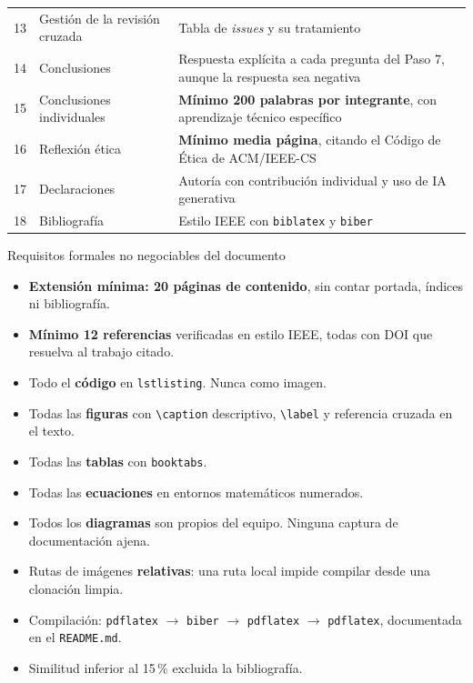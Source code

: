 \documentclass[11pt,a4paper]{article}
\begin{document}
\begin{center}
\begin{longtable}{@{}p{0.7cm}p{4.4cm}p{10.1cm}@{}}
			13 & Gestión de la revisión cruzada & Tabla de \emph{issues} y su tratamiento \\
			14 & Conclusiones & Respuesta explícita a cada pregunta del Paso 7, aunque la respuesta sea negativa \\
			15 & Conclusiones individuales & \textbf{Mínimo 200 palabras por integrante}, con aprendizaje técnico específico \\
			16 & Reflexión ética & \textbf{Mínimo media página}, citando el Código de Ética de ACM/IEEE-CS \\
			17 & Declaraciones & Autoría con contribución individual y uso de IA generativa \\
			18 & Bibliografía & Estilo IEEE con \texttt{biblatex} y \texttt{biber} \\
			\bottomrule
		\end{longtable}
	\end{center}
	
	\begin{uteqbox}{Requisitos formales no negociables del documento}
		\begin{itemize}[leftmargin=*,itemsep=2pt]
			\item \textbf{Extensión mínima: 20 páginas de contenido}, sin contar portada, índices ni bibliografía.
			\item \textbf{Mínimo 12 referencias} verificadas en estilo IEEE, todas con DOI que resuelva al trabajo citado.
			\item Todo el \textbf{código} en \texttt{lstlisting}. Nunca como imagen.
			\item Todas las \textbf{figuras} con \texttt{\textbackslash caption} descriptivo, \texttt{\textbackslash label} y referencia cruzada en el texto.
			\item Todas las \textbf{tablas} con \texttt{booktabs}.
			\item Todas las \textbf{ecuaciones} en entornos matemáticos numerados.
			\item Todos los \textbf{diagramas} son propios del equipo. Ninguna captura de documentación ajena.
			\item Rutas de imágenes \textbf{relativas}: una ruta local impide compilar desde una clonación limpia.
			\item Compilación: \texttt{pdflatex} $\rightarrow$ \texttt{biber} $\rightarrow$ \texttt{pdflatex} $\rightarrow$ \texttt{pdflatex}, documentada en el \texttt{README.md}.
			\item Similitud inferior al 15\,\% excluida la bibliografía.
		\end{itemize}
	\end{uteqbox}
	
\end{document}
